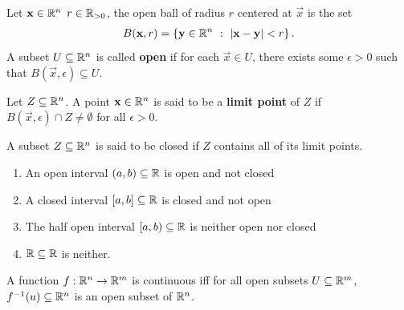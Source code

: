 \documentclass[12pt, twosided]{article}
\begin{document}
\begin{df}
  Let \(\mathbf{x} \in \mathbb{R}^n\) \( r \in \mathbb{R}_{>0}\), the open ball of radius \(r\) centered at \(\vec{x}\) is the set
  \begin{align*}
    B(\mathbf{x}, r) = \left\{ \mathbf{y} \in \mathbb{R}^n\ :\ |\mathbf{x} - \mathbf{y}| < r\right\}.
  \end{align*}
  A subset \(U \subseteq \mathbb{R}^n\) is called \textbf{open} if for each \(\vec{x} \in U\), there exists some \(\epsilon > 0\) such that \(B(\vec{x}, \epsilon) \subseteq U\).

  Let \(Z \subseteq \mathbb{R}^n\). A point \(\mathbf{x} \in \mathbb{R}^n\) is said to be a \textbf{limit point} of \(Z\) if \(B(\vec{x}, \epsilon) \cap Z \neq \emptyset\) for all \(\epsilon > 0\).

  A subset \(Z \subseteq \mathbb{R}^n\) is said to be closed if \(Z\) contains all of its limit points.
\end{df}

\begin{exa}
  
  \begin{enumerate}
  \item An open interval \((a, b) \subseteq \mathbb{R}\) is open and not closed
  \item A closed interval \([a,b] \subseteq \mathbb{R}\) is closed and not open
  \item The half open interval \([a, b) \subseteq \mathbb{R}\) is neither open nor closed
  \item \(\mathbb{R} \subseteq \mathbb{R}\) is neither.
  \end{enumerate}
\end{exa}

\begin{thm}
  A function \(f: \mathbb{R}^n \to \mathbb{R}^m\) is continuous iff for all open subsets \(U \subseteq \mathbb{R}^m\), \(f^{-1}(u) \subseteq \mathbb{R}^n\) is an open subset of \(\mathbb{R}^n\).
\end{thm}
\end{document}
